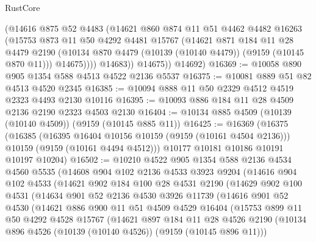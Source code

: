 \begin{lexlean}{RustCore}
\begin{coremodule}
              (@14616
                @875
                @52
                @4483
                (@14621
                  @860
                  @874
                  @11
                  @51
                  @4462
                  @4482
                  @16263
                  (@15753
                    @873
                    @11
                    @50
                    @4292
                    @4481
                    @15767
                    (@14621
                      @871
                      @184
                      @11
                      @28
                      @4479
                      @2190
                      (@10134 @870 @4479 (@10139 (@10140 @4479)) (@9159 (@10145 @870 @11)))
                      @14675))))
              @14683))
          @14675))
      @14692)
@16369 := @10058 @890 @905 @1354 @588 @4513 @4522 @2136 @5537
@16375 := @10081 @889 @51 @82 @4513 @4520 @2345
@16385 := @10094 @888 @11 @50 @2329 @4512 @4519 @2323 @4493 @2130 @10116
@16395 := @10093 @886 @184 @11 @28 @4509 @2136 @2190 @2323 @4503 @2130
@16404 := @10134 @885 @4509 (@10139 (@10140 @4509)) (@9159 (@10145 @885 @11))
@16425 := @16369
    (@16375
      (@16385
        (@16395 @16404 @10156 @10159 (@9159 (@10161 @4504 @2136)))
        @10159
        (@9159 (@10161 @4494 @4512)))
      @10177
      @10181
      @10186
      @10191
      @10197
      @10204)
@16502 := @10210
    @4522
    @905
    @1354
    @588
    @2136
    @4534
    @4560
    @5535
    (@14608
      @904
      @102
      @2136
      @4533
      @3923
      @9204
      (@14616
        @904
        @102
        @4533
        (@14621
          @902
          @184
          @100
          @28
          @4531
          @2190
          (@14629
            @902
            @100
            @4531
            (@14634
              @901
              @52
              @2136
              @4530
              @3926
              @11739
              (@14616
                @901
                @52
                @4530
                (@14621
                  @886
                  @900
                  @11
                  @51
                  @4509
                  @4529
                  @16404
                  (@15753
                    @899
                    @11
                    @50
                    @4292
                    @4528
                    @15767
                    (@14621
                      @897
                      @184
                      @11
                      @28
                      @4526
                      @2190
                      (@10134 @896 @4526 (@10139 (@10140 @4526)) (@9159 (@10145 @896 @11)))

\end{coremodule}
\end{lexlean}
